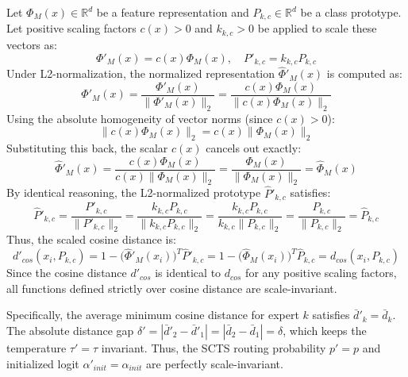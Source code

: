 \documentclass{article}
\theoremstyle{plain}
\theoremstyle{definition}
\theoremstyle{remark}
\begin{document}
Let $\Phi_{M}(x) \in \mathbb{R}^d$ be a feature representation and $P_{k,c} \in \mathbb{R}^d$ be a class prototype. Let positive scaling factors $c(x) > 0$ and $k_{k,c} > 0$ be applied to scale these vectors as:
\begin{equation}
\Phi'_{M}(x) = c(x)\Phi_{M}(x), \quad P'_{k,c} = k_{k,c} P_{k,c}
\end{equation}
Under L2-normalization, the normalized representation $\hat{\Phi}'_{M}(x)$ is computed as:
\begin{equation}
\hat{\Phi}'_{M}(x) = \frac{\Phi'_{M}(x)}{\|\Phi'_{M}(x)\|_2} = \frac{c(x)\Phi_{M}(x)}{\|c(x)\Phi_{M}(x)\|_2}
\end{equation}
Using the absolute homogeneity of vector norms (since $c(x) > 0$):
\begin{equation}
\|c(x)\Phi_{M}(x)\|_2 = c(x)\|\Phi_{M}(x)\|_2
\end{equation}
Substituting this back, the scalar $c(x)$ cancels out exactly:
\begin{equation}
\hat{\Phi}'_{M}(x) = \frac{c(x)\Phi_{M}(x)}{c(x)\|\Phi_{M}(x)\|_2} = \frac{\Phi_{M}(x)}{\|\Phi_{M}(x)\|_2} = \hat{\Phi}_{M}(x)
\end{equation}
By identical reasoning, the L2-normalized prototype $\hat{P}'_{k,c}$ satisfies:
\begin{equation}
\hat{P}'_{k,c} = \frac{P'_{k,c}}{\|P'_{k,c}\|_2} = \frac{k_{k,c}P_{k,c}}{\|k_{k,c}P_{k,c}\|_2} = \frac{k_{k,c}P_{k,c}}{k_{k,c}\|P_{k,c}\|_2} = \frac{P_{k,c}}{\|P_{k,c}\|_2} = \hat{P}_{k,c}
\end{equation}
Thus, the scaled cosine distance is:
\begin{equation}
d'_{cos}(x_i, P_{k,c}) = 1 - \big(\hat{\Phi}'_{M}(x_i)\big)^T \hat{P}'_{k,c} = 1 - \big(\hat{\Phi}_{M}(x_i)\big)^T \hat{P}_{k,c} = d_{cos}(x_i, P_{k,c})
\end{equation}
Since the cosine distance $d'_{cos}$ is identical to $d_{cos}$ for any positive scaling factors, all functions defined strictly over cosine distance are scale-invariant.

Specifically, the average minimum cosine distance for expert $k$ satisfies $\bar{d}'_k = \bar{d}_k$. The absolute distance gap $\delta' = |\bar{d}'_2 - \bar{d}'_1| = |\bar{d}_2 - \bar{d}_1| = \delta$, which keeps the temperature $\tau' = \tau$ invariant. Thus, the SCTS routing probability $p' = p$ and initialized logit $\alpha'_{init} = \alpha_{init}$ are perfectly scale-invariant.
\end{document}
